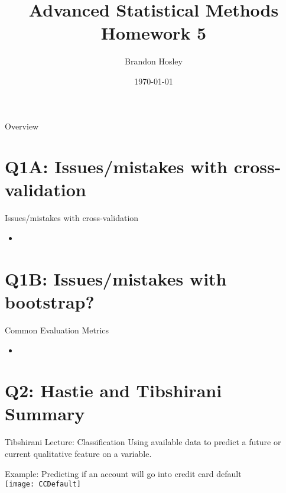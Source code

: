 \documentclass{beamer}
\title{Advanced Statistical Methods \\ Homework 5}
\author{Brandon Hosley}
\institute{University of Illinois - Springfield}
\date{\today}
\begin{document}
\frame{\titlepage}

\begin{frame}{Overview}
\tableofcontents
\end{frame}

\section[Q1A]{Q1A: Issues/mistakes with cross-validation}

\begin{frame}{Issues/mistakes with cross-validation}
	\begin{itemize}[<+->]
		\item 
	\end{itemize}
	
\end{frame}

\section[Q1B]{Q1B: Issues/mistakes with bootstrap?}
\begin{frame}{Common Evaluation Metrics}
	\begin{itemize}[<+->]
		\item 
	\end{itemize}
\end{frame}

\section[Q2]{Q2: Hastie and Tibshirani Summary}

\begin{frame}{Tibshirani Lecture: Classification}
	Using available data to predict a future or current qualitative feature on a variable. \\
	\begin{block}{Example:}
		Predicting if an account will go into credit card default \\
		\vspace{1em}
		\centering 
		\texttt{[image: CCDefault]}
		\vspace{1em}
	\end{block}
\end{frame}
\end{document}
